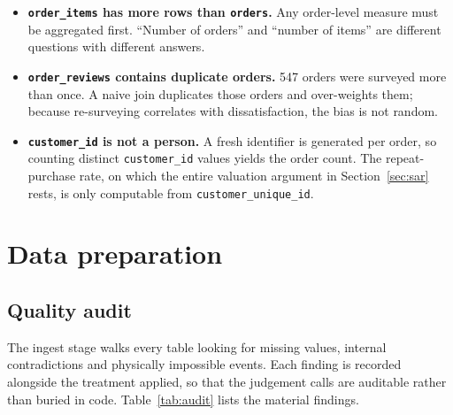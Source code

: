 \documentclass[11pt,a4paper]{article}
\begin{document}
\begin{itemize}[leftmargin=*,itemsep=0.3em]
  \item \textbf{\texttt{order\_items} has more rows than \texttt{orders}.} Any
        order-level measure must be aggregated first. ``Number of orders'' and
        ``number of items'' are different questions with different answers.
  \item \textbf{\texttt{order\_reviews} contains duplicate orders.} 547 orders
        were surveyed more than once. A naive join duplicates those orders and
        over-weights them; because re-surveying correlates with dissatisfaction,
        the bias is not random.
  \item \textbf{\texttt{customer\_id} is not a person.} A fresh identifier is
        generated per order, so counting distinct \texttt{customer\_id} values
        yields the order count. The repeat-purchase rate, on which the entire
        valuation argument in Section~\ref{sec:sar} rests, is only computable
        from \texttt{customer\_unique\_id}.
\end{itemize}

\section{Data preparation}

\subsection{Quality audit}

The ingest stage walks every table looking for missing values, internal
contradictions and physically impossible events. Each finding is recorded
alongside the treatment applied, so that the judgement calls are auditable rather
than buried in code. Table~\ref{tab:audit} lists the material findings.
\end{document}

